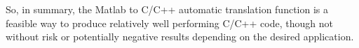 \documentclass{article}
\begin{document}
So, in summary, the Matlab to C/C++ automatic translation function is a feasible way to produce relatively well performing C/C++ code, though not without risk or potentially negative results depending on the desired application.


\end{document}
